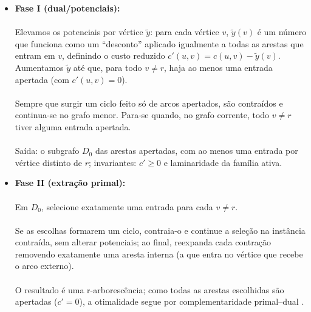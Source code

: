 \documentclass[12pt,a4paper]{article}
\def\emph#1{#1}%
\begin{document}
\begin{itemize}\setlength{\itemsep}{2pt}
    \item \textbf{Fase I (dual/potenciais):}
          \paragraph{}
          Elevamos os potenciais por vértice \(\tilde y\): para cada vértice \(v\), \(\tilde y(v)\) é um número que funciona como um “desconto” aplicado igualmente a todas as arestas que \emph{entram} em \(v\), definindo o custo reduzido \(c'(u,v)=c(u,v)-\tilde y(v)\). Aumentamos \(\tilde y\) até que, para todo \(v\neq r\), haja ao menos uma entrada \emph{apertada} (com \(c'(u,v)=0\)).

          \paragraph{}
          Sempre que surgir um ciclo feito só de arcos apertados, são contraídos e continua-se no grafo menor. Para-se quando, no grafo corrente, todo \(v\neq r\) tiver alguma entrada apertada.

          \paragraph{}
          Saída: o subgrafo \(D_0\) das arestas apertadas, com ao menos uma entrada por vértice distinto de \(r\); invariantes: \(c'\ge 0\) e laminaridade da família ativa.
    \item \textbf{Fase II (extração primal):}
          \paragraph{}
          Em \(D_0\), selecione exatamente uma entrada para cada \(v\neq r\).
          \paragraph{}
          Se as escolhas formarem um ciclo, contraia-o e continue a seleção na instância contraída, \emph{sem} alterar potenciais; ao final, reexpanda cada contração removendo exatamente uma aresta interna (a que entra no vértice que recebe o arco externo).
          \paragraph{}
          O resultado é uma r-arborescência; como todas as arestas escolhidas são apertadas (\(c'=0\)), a otimalidade segue por complementaridade primal–dual \cite{frank1981,frank2014,schrijver2003comb}.
\end{itemize}
\end{document}
